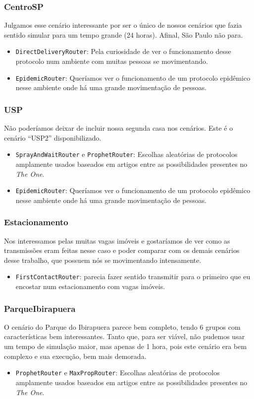 \documentclass[conference]{IEEEtran}
\begin{document}
\subsubsection{CentroSP}
Julgamos esse cenário interessante por ser o único de nossos cenários que fazia sentido simular para um tempo grande (24 horas). Afinal, São Paulo não para.
\begin{itemize}
\item \texttt{DirectDeliveryRouter}: Pela curiosidade de ver o funcionamento desse protocolo num ambiente com muitas pessoas se movimentando.
\item \texttt{EpidemicRouter}: Queríamos ver o funcionamento de um protocolo epidêmico nesse ambiente onde há uma grande
movimentação de pessoas.
\end{itemize}

\subsubsection{USP}
Não poderíamos deixar de incluir nossa segunda casa nos cenários. Este é o cenário \textquotedblleft USP2\textquotedblright{} disponibilizado.
\begin{itemize}
\item \texttt{SprayAndWaitRouter} e \texttt{ProphetRouter}: Escolhas aleatórias de protocolos amplamente usados baseados em artigos entre as possibilidades presentes no \emph{The One}.
\item \texttt{EpidemicRouter}: Queríamos ver o funcionamento de um protocolo epidêmico nesse ambiente onde há uma grande
movimentação de pessoas.
\end{itemize}

\subsubsection{Estacionamento}
Nos interessamos pelas muitas vagas imóveis e gostaríamos de ver como as transmissões eram feitas nesse caso e poder comparar com os demais cenários desse trabalho, que possuem nós se movimentando intensamente.
\begin{itemize}
\item \texttt{FirstContactRouter}: parecia fazer sentido transmitir para o primeiro que eu encostar num estacionamento com vagas imóveis.
\end{itemize}

\subsubsection{ParqueIbirapuera}
O cenário do Parque do Ibirapuera parece bem completo, tendo 6 grupos com características bem interessantes. Tanto que, para ser viável, não pudemos usar um tempo de simulação maior, mas apenas de 1 hora, pois este cenário era bem complexo e sua execução, bem mais demorada.
\begin{itemize}
\item \texttt{ProphetRouter} e \texttt{MaxPropRouter}: Escolhas aleatórias de protocolos amplamente usados baseados em artigos entre as possibilidades presentes no \emph{The One}.
\end{itemize}
\end{document}
